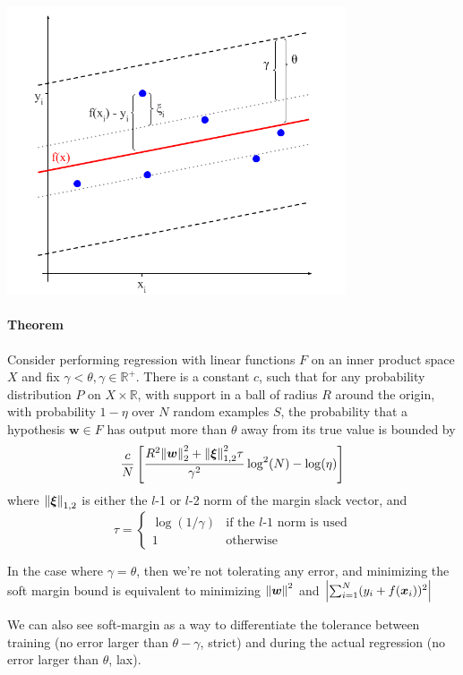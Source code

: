 \documentclass[oneside,onecolumn]{report}
\begin{document}
\begin{center}
    \includegraphics[width=10cm]{regression_slack.png}
\end{center}

\paragraph{Theorem} Consider performing regression with linear functions $F$ on an inner product space $X$ and fix $\gamma < \theta, \gamma \in \mathbb R^+$.
There is a constant $c$, such that for any probability distribution $P$ on $X \times \mathbb R$, with support in a ball of radius $R$ around the origin, with probability $1 - \eta$ over $N$ random examples $S$, the probability that a hypothesis $\bm w \in F$ has output more than $\theta$ away from its true value is bounded by
$$ \frac{c}{N} \left[ \frac{R^2 \norm{\bm w}^2_2 + \norm{\bm \xi}_{1, 2}^2 \tau}{\gamma^2} \log^2(N) - \log(\eta) \right] $$
where $\norm{\bm \xi}_{1, 2}$ is either the $l$-1 or $l$-2 norm of the margin slack vector, and
$$ \tau = \begin{cases}
    \log(1 / \gamma) & \text{if the $l$-1 norm is used} \\
    1 & \text{otherwise}
\end{cases} $$

In the case where $\gamma = \theta$, then we're not tolerating any error, and minimizing the soft margin bound is equivalent to minimizing $\norm{\bm w}^2$ and $\abs{\sum_{i = 1}^N (y_i + f(\bm x_i))^2}$

We can also see soft-margin as a way to differentiate the tolerance between training (no error larger than $\theta - \gamma$, strict) and during the actual regression (no error larger than $\theta$, lax).
\end{document}
